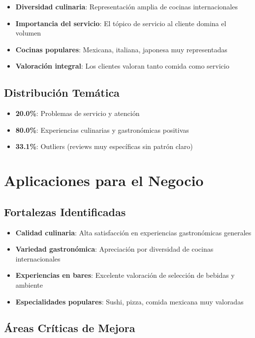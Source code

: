\documentclass[12pt,a4paper,twoside,openany]{book}
\begin{document}
\begin{itemize}
    \item \textbf{Diversidad culinaria}: Representación amplia de cocinas internacionales
    \item \textbf{Importancia del servicio}: El tópico de servicio al cliente domina el volumen
    \item \textbf{Cocinas populares}: Mexicana, italiana, japonesa muy representadas
    \item \textbf{Valoración integral}: Los clientes valoran tanto comida como servicio
\end{itemize}

\subsection{Distribución Temática}

\begin{itemize}
    \item \textbf{20.0\%}: Problemas de servicio y atención
    \item \textbf{80.0\%}: Experiencias culinarias y gastronómicas positivas
    \item \textbf{33.1\%}: Outliers (reviews muy específicas sin patrón claro)
\end{itemize}

\section{Aplicaciones para el Negocio}

\subsection{Fortalezas Identificadas}

\begin{itemize}
    \item \textbf{Calidad culinaria}: Alta satisfacción en experiencias gastronómicas generales
    \item \textbf{Variedad gastronómica}: Apreciación por diversidad de cocinas internacionales
    \item \textbf{Experiencias en bares}: Excelente valoración de selección de bebidas y ambiente
    \item \textbf{Especialidades populares}: Sushi, pizza, comida mexicana muy valoradas
\end{itemize}

\subsection{Áreas Críticas de Mejora}
\end{document}
